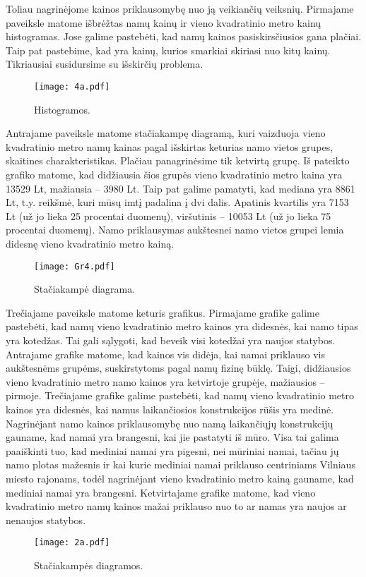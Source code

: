 \documentclass[a4paper]{article}
\begin{document}
\hspace*{0,01cm}Toliau nagrinėjome kainos priklausomybę nuo ją veikiančių veiksnių. Pirmajame paveiksle matome išbrėžtas namų kainų ir vieno kvadratinio metro kainų histogramas. Jose galime pastebėti, kad namų kainos pasiskirsčiusios gana plačiai. Taip pat pastebime, kad yra kainų, kurios smarkiai skiriasi nuo kitų kainų. Tikriausiai susidursime su išskirčių problema.
\begin{figure}[H]
  \caption{Histogramos.}
  \centering
    \texttt{[image: 4a.pdf]}
\end{figure}

\hspace*{0,01cm}Antrajame paveiksle matome stačiakampę diagramą, kuri vaizduoja vieno kvadratinio metro namų kainas pagal išskirtas keturias namo vietos grupes, skaitines charakteristikas. Plačiau panagrinėsime tik ketvirtą grupę. Iš pateikto grafiko matome, kad didžiausia šios grupės vieno kvadratinio metro kaina yra 13529 Lt, mažiausia -- 3980 Lt. Taip pat galime pamatyti, kad mediana yra 8861 Lt, t.y. reikšmė, kuri mūsų imtį padalina į dvi dalis. Apatinis kvartilis yra 7153 Lt (už jo lieka 25 procentai duomenų),  viršutinis -- 10053 Lt (už jo lieka 75 procentai duomenų). Namo priklausymas aukštesnei namo vietos grupei lemia didesnę vieno kvadratinio metro kainą.
\begin{figure}[H] 
  \caption{Stačiakampė diagrama.}
  \centering
    \texttt{[image: Gr4.pdf]}
\end{figure}

\hspace*{0,01cm}Trečiajame paveiksle matome keturis grafikus. Pirmajame grafike galime pastebėti, kad namų vieno kvadratinio metro kainos yra didesnės, kai namo tipas yra kotedžas. Tai gali sąlygoti, kad beveik visi kotedžai yra naujos statybos. Antrajame grafike matome, kad kainos vis didėja, kai namai priklauso vis aukštesnėms grupėms, suskirstytoms pagal namų fizinę būklę. Taigi, didžiausios vieno kvadratinio metro namo kainos yra ketvirtoje grupėje, mažiausios -- pirmoje. Trečiajame grafike galime pastebėti, kad namų vieno kvadratinio metro kainos yra didesnės, kai namus laikančiosios konstrukcijos rūšis yra medinė. Nagrinėjant namo kainos priklausomybę nuo namą laikančiųjų konstrukcijų gauname, kad namai yra brangesni, kai jie pastatyti iš mūro. Visa tai galima paaiškinti tuo, kad mediniai namai yra pigesni, nei mūriniai namai, tačiau jų namo plotas mažesnis ir kai kurie mediniai namai priklauso centriniams Vilniaus miesto rajonams, todėl nagrinėjant vieno kvadratinio metro kainą gauname, kad mediniai namai yra brangesni. Ketvirtajame grafike matome, kad vieno kvadratinio metro namų kainos mažai priklauso nuo to ar namas yra naujos ar nenaujos statybos.
\begin{figure}[H]
  \caption{Stačiakampės diagramos.}
  \centering
    \texttt{[image: 2a.pdf]}
\end{figure}
\end{document}
